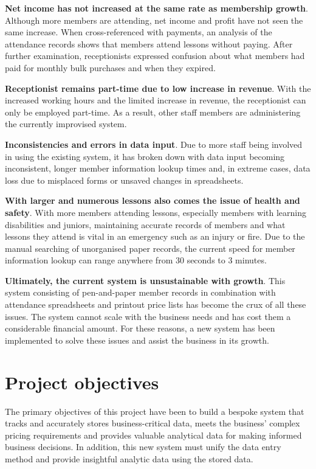 \textbf{Net income has not increased at the same rate as membership growth}. Although more members are attending, net income and profit have not seen the same increase. When cross-referenced with payments, an analysis of the attendance records shows that members attend lessons without paying. After further examination, receptionists expressed confusion about what members had paid for monthly bulk purchases and when they expired.

\textbf{Receptionist remains part-time due to low increase in revenue}. With the increased working hours and the limited increase in revenue, the receptionist can only be employed part-time. As a result, other staff members are administering the currently improvised system.

\textbf{Inconsistencies and errors in data input}. Due to more staff being involved in using the existing system, it has broken down with data input becoming inconsistent, longer member information lookup times and, in extreme cases, data loss due to misplaced forms or unsaved changes in spreadsheets.

\textbf{With larger and numerous lessons also comes the issue of health and safety}. With more members attending lessons, especially members with learning disabilities and juniors, maintaining accurate records of members and what lessons they attend is vital in an emergency such as an injury or fire. Due to the manual searching of unorganised paper records, the current speed for member information lookup can range anywhere from 30 seconds to 3 minutes.

\textbf{Ultimately, the current system is unsustainable with growth}. This system consisting of pen-and-paper member records in combination with attendance spreadsheets and printout price lists has become the crux of all these issues. The system cannot scale with the business needs and has cost them a considerable financial amount. For these reasons, a new system has been implemented to solve these issues and assist the business in its growth. 


\section{Project objectives}
The primary objectives of this project have been to build a bespoke system that tracks and accurately stores business-critical data, meets the business' complex pricing requirements and provides valuable analytical data for making informed business decisions. In addition, this new system must unify the data entry method and provide insightful analytic data using the stored data.

